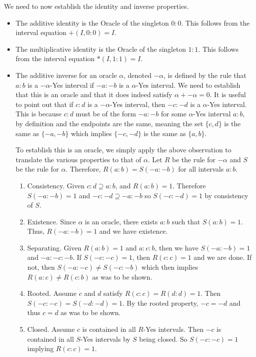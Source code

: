\documentclass[12pt]{article}
\theoremstyle{remark}
\begin{document}
We need to now establish the identity and inverse properties. 

\begin{itemize}
    \item The additive identity is the Oracle of the singleton $0:0$. This follows from the interval equation $+(I, 0:0) = I$.
    \item The multiplicative identity is the Oracle of the singleton $1:1$. This follows from the interval equation $*(I, 1:1) = I$.
    \item The additive inverse for an oracle $\alpha$, denoted $-\alpha$, is defined by the rule that $a:b$ is a $-\alpha$-Yes interval if $-a:-b$ is a $\alpha$-Yes interval. We need to establish that this is an oracle and that it does indeed satisfy $\alpha + -\alpha = 0$. 
    It is useful to point out that if $c:d$ is a $-\alpha$-Yes interval, then $-c:-d$ is a $\alpha$-Yes interval. This is because $c:d$ must be of the form $-a:-b$ for some $\alpha$-Yes interval $a:b$, by definition and the endpoints are the same, meaning the set $\{c,d\}$ is the same as $\{-a, -b\}$ which implies $\{-c, -d\}$ is the same as $\{a, b\}$.
    
    To establish this is an oracle, we simply apply the above observation to translate the various properties to that of $\alpha$. Let $R$ be the rule for $-\alpha$ and $S$ be the rule for $\alpha$. Therefore, $R(a:b)=S(-a:-b)$ for all intervals $a:b$.
    
    \begin{enumerate}
        \item Consistency. Given $c:d \supseteq a:b$, and $R(a:b)=1$. Therefore $S(-a:-b) = 1$ and $-c:-d \supseteq -a:-b$ so $S(-c:-d)=1$ by consistency of $S$. 
        \item Existence. Since $\alpha$ is an oracle, there exists $a:b$ such that $S(a:b)=1$. Thus, $R(-a:-b)=1$ and we have existence. 
        \item Separating. Given $R(a:b)=1$ and $a:c:b$, then we have $S(-a:-b)=1$ and $-a:-c:-b$. If $S(-c:-c)=1$, then $R(c:c)=1$ and we are done. If not, then $S(-a:-c) \neq S(-c:-b)$ which then implies $R(a:c)\neq R(c:b)$ as was to be shown. 
        \item Rooted. Assume $c$ and $d$ satisfy $R(c:c)=R(d:d)=1$. Then $S(-c:-c)=S(-d:-d)=1$. By the rooted property, $-c = -d$ and thus $c=d$ as was to be shown. 
        \item Closed. Assume $c$ is contained in all $R$-Yes intervals. Then $-c$ is contained in all $S$-Yes intervals by $S$ being closed. So $S(-c:-c)=1$ implying $R(c:c)=1$.
    \end{enumerate}
    

\end{itemize}
\end{document}
